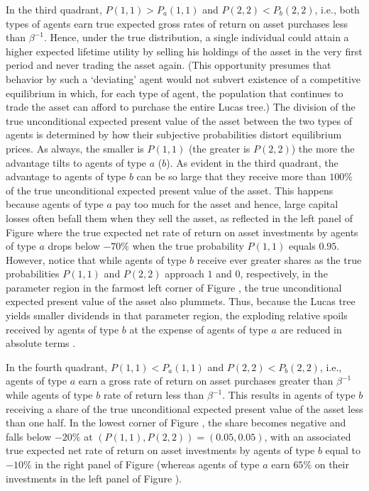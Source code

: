 In the third quadrant, $P(1,1)>P_a(1,1)$ and 
$P(2,2)<P_b(2,2)$, i.e., both types of agents
earn true expected gross rates of return on asset 
purchases less than $\beta^{-1}$. 
Hence, under the true
distribution,  a single individual could attain a
higher expected lifetime utility by selling his  holdings of the asset
in the very first period and never trading  the asset again.
(This opportunity presumes  that behavior by  such a `deviating'
agent would  not subvert  existence of a
competitive equilibrium in which, for each type of agent,
the population that continues
to trade the asset
can afford to purchase the entire Lucas tree.)
The division of the true unconditional expected 
present value of the asset between the two types
of agents is determined by how their subjective
probabilities distort equilibrium prices.
As always, the smaller is $P(1,1)$ (the greater is
$P(2,2)$) the more the advantage  tilts to agents 
of type $a$ ($b$). As evident 
in the third quadrant, the advantage to agents 
of type $b$ can be so large that they receive 
more than $100\%$ of the true unconditional 
expected present value of the asset.
This happens because agents of type $a$ 
pay too much for  the 
asset and hence, large capital losses 
often befall them when they sell the
asset, as reflected in the left panel of
Figure  where the true expected net 
rate of return on asset investments by agents 
of type $a$ drops below $-70\%$ when the true 
probability $P(1,1)$ equals $0.95$. However, notice that 
while agents of type $b$ receive  ever greater 
shares as the true probabilities $P(1,1)$ and 
$P(2,2)$ approach $1$ and $0$, respectively,  
in the parameter region in 
the farmost left corner of Figure ,
 the true unconditional
expected present value of the asset  also plummets. Thus, because
 the Lucas tree yields
smaller dividends in that parameter region, the exploding 
relative spoils received by agents of type $b$ 
at the expense of agents of type $a$ are reduced 
in absolute terms .

In the fourth quadrant, $P(1,1)<P_a(1,1)$ and 
$P(2,2)<P_b(2,2)$, i.e., agents of type $a$ earn 
a gross rate of return on asset purchases greater 
than $\beta^{-1}$ while agents of type $b$  rate of return less than $\beta^{-1}$. This results in agents of 
type $b$ receiving a share of the true unconditional 
expected present value of the asset less than one 
half. In the lowest corner of Figure ,
the share becomes negative and falls below 
$-20\%$ at $(P(1,1),P(2,2))=(0.05,0.05)$, with an  
associated true expected net rate of return on asset 
investments by agents of type $b$ equal to $-10\%$ in 
the right panel of Figure  (whereas
agents of type $a$ earn $65\%$ on their
investments in the left panel of Figure ).


